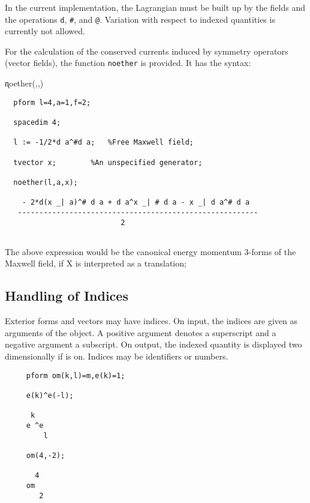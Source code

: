 In the current implementation, the Lagrangian must be built up by the
fields and the operations \texttt{d}, \texttt{\#}, and \texttt{@}. Variation
with respect to indexed quantities is currently not allowed.

For the calculation of the conserved currents induced by symmetry
operators (vector fields), the function \texttt{noether}\label{NOETHER}
\hypertarget{operator:NOETHER}{}
is provided.  It has the syntax:

\hspace*{2em}
\k{noether}(,,)

\example{}
\begin{verbatim}
  pform l=4,a=1,f=2;

  spacedim 4;

  l := -1/2*d a^#d a;   %Free Maxwell field;

  tvector x;        %An unspecified generator;

  noether(l,a,x);

    - 2*d(x _| a)^# d a + d a^x _| # d a - x _| d a^# d a
   --------------------------------------------------------
                           2


\end{verbatim}

The above expression would be the canonical energy
momentum 3-forms of the Maxwell field, if X is interpreted
as a translation;



\subsection{Handling of Indices}
Exterior forms and vectors may have indices.  On input, the indices
are given as arguments of the object.  A positive argument denotes a
superscript and a negative argument a subscript.  On output, the
indexed quantity is displayed two dimensionally if  is on.
Indices may be identifiers or numbers.

\example{}

\begin{verbatim}
     pform om(k,l)=m,e(k)=1;

     e(k)^e(-l);

      k
     e ^e
         l

     om(4,-2);

       4
     om
        2
\end{verbatim}

